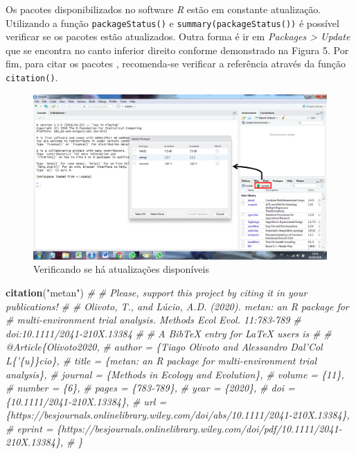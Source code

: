\documentclass[
]{book}
\newenvironment{Shaded}{\begin{snugshade}}{\end{snugshade}}
\newcommand{\CommentTok}[1]{\textcolor[rgb]{0.56,0.35,0.01}{\textit{#1}}}
\newcommand{\KeywordTok}[1]{\textcolor[rgb]{0.13,0.29,0.53}{\textbf{#1}}}
\newcommand{\NormalTok}[1]{#1}
\newcommand{\StringTok}[1]{\textcolor[rgb]{0.31,0.60,0.02}{#1}}
\begin{document}
Os pacotes disponibilizados no software \emph{R} estão em constante atualização. Utilizando a função \texttt{packageStatus()} e \texttt{summary(packageStatus())} é possível verificar se os pacotes estão atualizados. Outra forma é ir em \emph{Packages \textgreater{} Update} que se encontra no canto inferior direito conforme demonstrado na Figura 5. Por fim, para citar os pacotes , recomenda-se verificar a referência através da função \texttt{citation()}.  

\begin{figure}
\centering
\includegraphics{figures/Update.png}
\caption{Verificando se há atualizações disponíveis}
\end{figure}

\begin{Shaded}
\begin{Highlighting}[]
\KeywordTok{citation}\NormalTok{(}\StringTok{"metan"}\NormalTok{)}
\CommentTok{# }
\CommentTok{# Please, support this project by citing it in your publications!}
\CommentTok{# }
\CommentTok{#   Olivoto, T., and Lúcio, A.D. (2020). metan: an R package for}
\CommentTok{#   multi-environment trial analysis. Methods Ecol Evol. 11:783-789}
\CommentTok{#   doi:10.1111/2041-210X.13384}
\CommentTok{# }
\CommentTok{# A BibTeX entry for LaTeX users is}
\CommentTok{# }
\CommentTok{#   @Article\{Olivoto2020,}
\CommentTok{#     author = \{Tiago Olivoto and Alessandro Dal'Col L\{'\{u\}\}cio\},}
\CommentTok{#     title = \{metan: an R package for multi-environment trial analysis\},}
\CommentTok{#     journal = \{Methods in Ecology and Evolution\},}
\CommentTok{#     volume = \{11\},}
\CommentTok{#     number = \{6\},}
\CommentTok{#     pages = \{783-789\},}
\CommentTok{#     year = \{2020\},}
\CommentTok{#     doi = \{10.1111/2041-210X.13384\},}
\CommentTok{#     url = \{https://besjournals.onlinelibrary.wiley.com/doi/abs/10.1111/2041-210X.13384\},}
\CommentTok{#     eprint = \{https://besjournals.onlinelibrary.wiley.com/doi/pdf/10.1111/2041-210X.13384\},}
\CommentTok{#   \}}
\end{Highlighting}
\end{Shaded}
\end{document}
